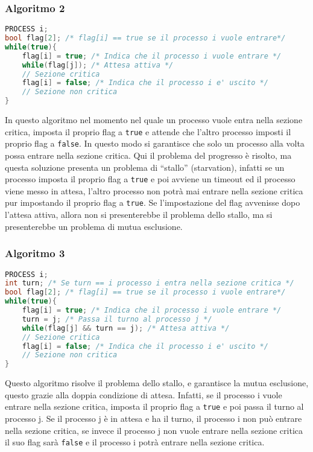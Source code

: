         \subsubsection{Algoritmo 2}
            \begin{lstlisting}[language=C++,basicstyle=\footnotesize]
PROCESS i;
bool flag[2]; /* flag[i] == true se il processo i vuole entrare*/
while(true){
    flag[i] = true; /* Indica che il processo i vuole entrare */
    while(flag[j]); /* Attesa attiva */
    // Sezione critica
    flag[i] = false; /* Indica che il processo i e' uscito */
    // Sezione non critica
}
            \end{lstlisting}
            In questo algoritmo nel momento nel quale un processo vuole entra nella sezione critica, imposta il proprio flag a \texttt{true} e attende che l'altro processo imposti il proprio flag a \texttt{false}. In questo modo si garantisce che solo un processo alla volta possa entrare nella sezione critica. Qui il problema del progresso è risolto, ma questa soluzione presenta un problema di ``stallo'' (starvation), infatti se un processo imposta il proprio flag a \texttt{true} e poi avviene un timeout ed il processo viene messo in attesa, l'altro processo non potrà mai entrare nella sezione critica pur impostando il proprio flag a \texttt{true}.\newline
            Se l'impostazione del flag avvenisse dopo l'attesa attiva, allora non si presenterebbe il problema dello stallo, ma si presenterebbe un problema di mutua esclusione.
            \subsubsection{Algoritmo 3}
            \begin{lstlisting}[language=C++,basicstyle=\footnotesize]
PROCESS i;
int turn; /* Se turn == i processo i entra nella sezione critica */
bool flag[2]; /* flag[i] == true se il processo i vuole entrare*/
while(true){
    flag[i] = true; /* Indica che il processo i vuole entrare */
    turn = j; /* Passa il turno al processo j */
    while(flag[j] && turn == j); /* Attesa attiva */
    // Sezione critica
    flag[i] = false; /* Indica che il processo i e' uscito */
    // Sezione non critica
}
            \end{lstlisting}
            Questo algoritmo risolve il problema dello stallo, e garantisce la mutua esclusione, questo grazie alla doppia condizione di attesa. Infatti, se il processo i vuole entrare nella sezione critica, imposta il proprio flag a \texttt{true} e poi passa il turno al processo j. Se il processo j è in attesa e ha il turno, il processo i non può entrare nella sezione critica, se invece il processo j non vuole entrare nella sezione critica il suo flag sarà \texttt{false} e il processo i potrà entrare nella sezione critica. 
